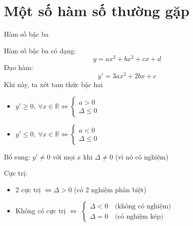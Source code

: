 \section{Một số hàm số thường gặp}
\begin{lythuyetbox}{Hàm số bậc ba}

Hàm số bậc ba có dạng:
\[ y = ax^3 + bx^2 + cx + d \]
Đạo hàm:
\[ y' = 3a x^2 + 2b x + c \]
Khi này, ta xét tam thức bậc hai
\begin{itemize}
    \item $y' \geq 0,\ \forall x \in \mathbb{R} \Leftrightarrow \begin{cases} a > 0 \\ \Delta \leq 0 \end{cases}$
    \item $y' \leq 0,\ \forall x \in \mathbb{R} \Leftrightarrow \begin{cases} a < 0 \\ \Delta \leq 0 \end{cases}$ 
\end{itemize}
Bổ sung: $y' \neq 0$ với mọi $x$ khi $\Delta \neq 0$ (vì nó có nghiệm)

\vspace{1.5em}
Cực trị:
\begin{itemize}
    \item 2 cực trị $\Leftrightarrow \Delta > 0$ (có 2 nghiệm phân biệt)
    \item Không có cực trị $\Leftrightarrow$
    $\left\{\begin{array}{l}
        \Delta < 0 \quad \text{(không có nghiệm)} \\
        \Delta = 0 \quad \text{(có nghiệm kép)}
    \end{array}\right.$
\end{itemize}

\end{lythuyetbox}